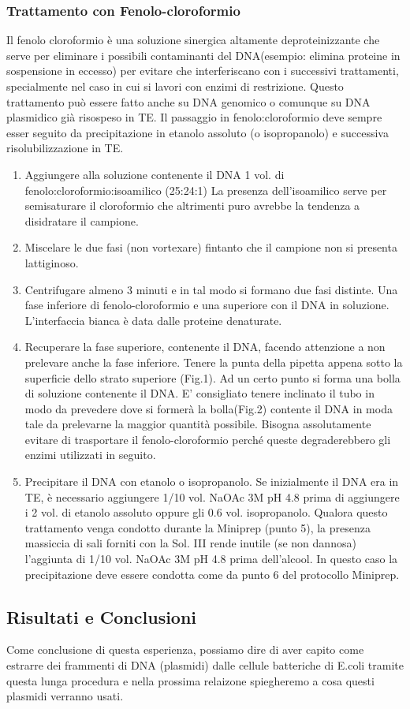 \subsubsection{Trattamento con Fenolo-cloroformio}

Il fenolo cloroformio è una soluzione sinergica altamente deproteinizzante che serve per eliminare i possibili contaminanti del DNA(esempio: elimina proteine in sospensione in eccesso) per evitare che interferiscano con i successivi trattamenti, specialmente nel caso in cui si lavori con enzimi di restrizione. Questo trattamento può essere fatto anche su DNA genomico o comunque su DNA plasmidico già risospeso in TE. Il passaggio in fenolo:cloroformio deve sempre esser seguito da precipitazione in etanolo assoluto (o isopropanolo) e successiva risolubilizzazione in TE.

\begin{enumerate}
  \item Aggiungere alla soluzione contenente il DNA 1 vol. di fenolo:cloroformio:isoamilico (25:24:1)
La presenza dell’isoamilico serve per semisaturare il cloroformio che altrimenti puro avrebbe la tendenza a disidratare il campione.

  \item Miscelare le due fasi (non vortexare) fintanto che il campione non si presenta lattiginoso.

  \item Centrifugare almeno 3 minuti e in tal modo si formano due fasi distinte. Una fase inferiore di fenolo-cloroformio e una superiore con il DNA in soluzione. L’interfaccia bianca è data dalle proteine denaturate.

  \item Recuperare la fase superiore, contenente il DNA, facendo attenzione a non prelevare anche la fase inferiore. Tenere la punta della pipetta appena sotto la superficie dello strato superiore (Fig.1). Ad un certo punto si forma una bolla di soluzione contenente il DNA. E’ consigliato tenere inclinato il tubo in modo da prevedere dove si formerà la bolla(Fig.2) contente il DNA in moda tale da prelevarne la maggior quantità possibile. Bisogna assolutamente evitare di trasportare il fenolo-cloroformio perché queste degraderebbero gli enzimi utilizzati in seguito.

  \item Precipitare il DNA con etanolo o isopropanolo. Se inizialmente il DNA era in TE, è necessario aggiungere 1/10 vol. NaOAc 3M pH 4.8 prima di aggiungere i 2 vol. di etanolo assoluto oppure gli 0.6 vol. isopropanolo. Qualora questo trattamento venga condotto durante la Miniprep (punto 5), la presenza massiccia di sali forniti con la Sol. III  rende inutile (se non dannosa) l’aggiunta di 1/10 vol. NaOAc 3M pH 4.8 prima dell’alcool. In questo caso la precipitazione deve essere condotta come da punto 6 del protocollo Miniprep.


\end{enumerate}

\subsection{Risultati e Conclusioni}

Come conclusione di questa esperienza, possiamo dire di aver capito come estrarre dei frammenti di DNA (plasmidi) dalle cellule batteriche di E.coli tramite questa lunga procedura e nella prossima relaizone spiegheremo a cosa questi plasmidi verranno usati.
